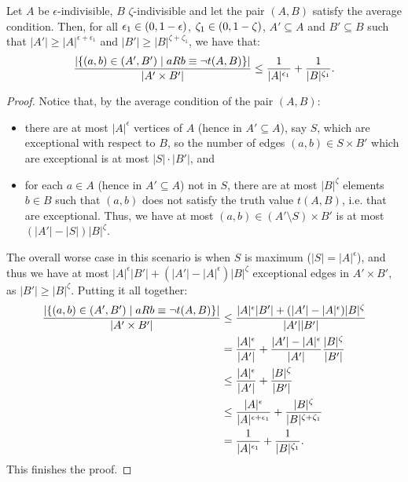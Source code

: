         \begin{lemma} \label{lem:exceptions_bound_of_epsilon_indivisible_sets}
            Let $A$ be $\epsilon$-indivisible, $B$ $\zeta$-indivisible and let the pair $(A,B)$ satisfy the average condition.
            Then, for all $\epsilon_1 \in ( 0, 1-\epsilon )$, $\zeta_1 \in ( 0, 1-\zeta )$, $A' \subseteq A$
                and $B' \subseteq B$ such that $|A'| \geq |A|^{\epsilon + \epsilon_1}$ and $|B'| \geq |B|^{\zeta + \zeta_1}$,
                we have that:
            \[
                \frac{|\{ (a,b) \in (A',B') \mid a R b \equiv \neg t(A,B) \}|}{|A' \times B'|} \leq
                    \frac{1}{|A|^{\epsilon_1}} + \frac{1}{|B|^{\zeta_1}}.
            \]
            \begin{proof}
                Notice that, by the average condition of the pair $(A,B)$:
                \begin{itemize}
                    \item there are at most $|A|^\epsilon$ vertices of $A$ (hence in $A' \subseteq A$), say $S$, which are exceptional
                        with respect to $B$, so the number of edges $(a,b) \in S \times B'$ which are exceptional is at most
                        $|S| \cdot |B'|$, and
                    \item for each $a \in A$ (hence in $A' \subseteq A$) not in $S$, there are at most $|B|^\zeta$ elements
                        $b \in B$ such that $(a,b)$ does not satisfy the truth value $t(A,B)$, i.e. that are exceptional.
                        Thus, we have at most $(a,b) \in (A' \setminus S) \times B'$ is at most $(|A'| - |S|) |B|^\zeta$.
                \end{itemize}
                The overall worse case in this scenario is when $S$ is maximum ($|S| = |A|^\epsilon$), and thus we have at most
                $|A|^\epsilon |B'| + (|A'| - |A|^\epsilon) |B|^\zeta$ exceptional edges in $A' \times B'$, as $|B'| \geq |B|^\zeta$.
                Putting it all together:
                \[
                    \begin{split}
                        \frac{|\{ (a,b) \in (A',B') \mid a R b \equiv \neg t(A,B) \}|}{|A' \times B'|}
                            &\leq \frac{|A|^\epsilon |B'| + (|A'| - |A|^\epsilon) |B|^\zeta}{|A'| |B'|} \\
                            &= \frac{|A|^\epsilon}{|A'|} + \frac{|A'| - |A|^\epsilon}{|A'|} \frac{|B|^\zeta}{|B'|} \\
                            &\leq \frac{|A|^\epsilon}{|A'|} + \frac{|B|^\zeta}{|B'|} \\
                            &\leq \frac{|A|^\epsilon}{|A|^{\epsilon + \epsilon_1}} + \frac{|B|^\zeta}{|B|^{\zeta + \zeta_1}} \\
                            &= \frac{1}{|A|^{\epsilon_1}} + \frac{1}{|B|^{\zeta_1}}.
                    \end{split}
                \]
                This finishes the proof.
            \end{proof}
        \end{lemma}

